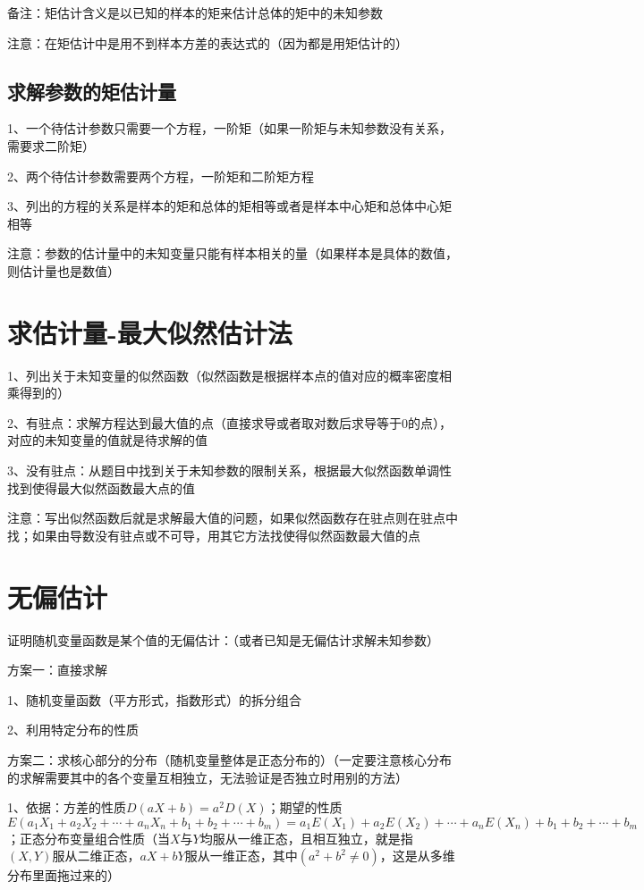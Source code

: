 备注：矩估计含义是以已知的样本的矩来估计总体的矩中的未知参数

注意：在矩估计中是用不到样本方差的表达式的（因为都是用矩估计的）



\subsection{求解参数的矩估计量}

1、一个待估计参数只需要一个方程，一阶矩（如果一阶矩与未知参数没有关系，需要求二阶矩）

2、两个待估计参数需要两个方程，一阶矩和二阶矩方程

3、列出的方程的关系是样本的矩和总体的矩相等或者是样本中心矩和总体中心矩相等

注意：参数的估计量中的未知变量只能有样本相关的量（如果样本是具体的数值，则估计量也是数值）

\section{求估计量-最大似然估计法}

1、列出关于未知变量的似然函数（似然函数是根据样本点的值对应的概率密度相乘得到的）

2、有驻点：求解方程达到最大值的点（直接求导或者取对数后求导等于0的点），对应的未知变量的值就是待求解的值

3、没有驻点：从题目中找到关于未知参数的限制关系，根据最大似然函数单调性找到使得最大似然函数最大点的值

注意：写出似然函数后就是求解最大值的问题，如果似然函数存在驻点则在驻点中找；如果由导数没有驻点或不可导，用其它方法找使得似然函数最大值的点

\section{无偏估计}

证明随机变量函数是某个值的无偏估计：（或者已知是无偏估计求解未知参数）

方案一：直接求解

1、随机变量函数（平方形式，指数形式）的拆分组合

2、利用特定分布的性质

方案二：求核心部分的分布（随机变量整体是正态分布的）（一定要注意核心分布的求解需要其中的各个变量互相独立，无法验证是否独立时用别的方法）

1、依据：方差的性质$D(a X+b)=a^{2} D(X) $；期望的性质$E(a_1X_1+a_2X_2+\cdots+a_nX_n+b_1+b_2+\cdots+b_m)=a_1E(X_1)+a_2E(X_2)+\cdots+a_nE(X_n)+b_1+b_2+\cdots+b_m$；正态分布变量组合性质（当$X$与$Y$均服从一维正态，且相互独立，就是指$(X, Y)$服从二维正态，$a X+b Y$服从一维正态，其中$\left(a^{2}+b^{2} \neq 0\right)$，这是从多维分布里面拖过来的）

